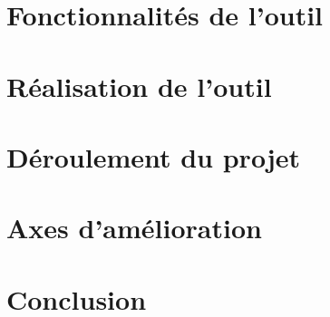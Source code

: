 \documentclass{article}
\begin{document}


\newpage

\section{Fonctionnalités de l'outil}
\bigbreak



\newpage
\section{Réalisation de l'outil}
\bigbreak



\newpage

\section{Déroulement du projet}
\bigbreak 
\bigbreak 



\newpage
\section{Axes d'amélioration}
\bigbreak

\bigbreak

\newpage
\section{Conclusion}
\bigbreak
\bigbreak



\newpage
\nocite{*}


\end{document}
